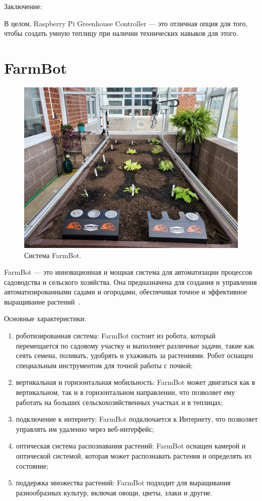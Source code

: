 Заключение:

В целом, Raspberry Pi Greenhouse Controller --- это отличная опция для того, чтобы создать умную теплицу при наличии технических навыков для этого. 

\section{FarmBot}

\begin{figure}[H]
    \centering
    \includegraphics[scale=0.3]{images/FarmBot.png}
    \caption{Система FarmBot.}
    \label{fig:FarmBot}
\end{figure}

FarmBot --- это инновационная и мощная система для автоматизации процессов садоводства и сельского хозяйства. Она предназначена для создания и управления автоматизированными садами и огородами, обеспечивая точное и эффективное выращивание растений~\cite{FarmBot}.

Основные характеристики:

\begin{enumerate}
    \item роботизированная система: FarmBot состоит из робота, который перемещается по садовому участку и выполняет различные задачи, такие как сеять семена, поливать, удобрять и ухаживать за растениями. Робот оснащен специальным инструментом для точной работы с почвой;
    \item вертикальная и горизонтальная мобильность: FarmBot может двигаться как в вертикальном, так и в горизонтальном направлении, что позволяет ему работать на больших сельскохозяйственных участках и в теплицах;
    \item подключение к интернету: FarmBot подключается к Интернету, что позволяет управлять им удаленно через веб-интерфейс;
    \item оптическая система распознавания растений: FarmBot оснащен камерой и оптической системой, которая может распознавать растения и определять их состояние;
    \item поддержка множества растений: FarmBot подходит для выращивания разнообразных культур, включая овощи, цветы, злаки и другие.
\end{enumerate}

